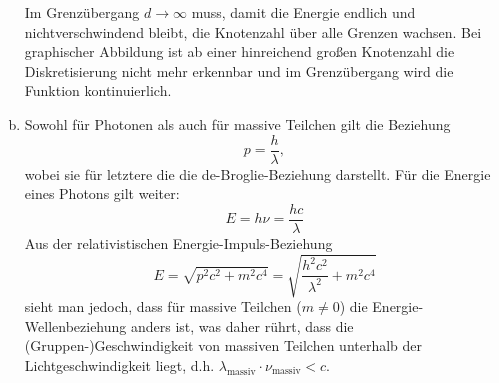 \begin{enumerate}[(a)]
Im Grenzübergang $d \to\infty$ muss, damit die Energie endlich und nichtverschwindend bleibt, die Knotenzahl über alle Grenzen wachsen. Bei graphischer Abbildung ist ab einer hinreichend großen Knotenzahl die Diskretisierung nicht mehr erkennbar und im Grenzübergang wird die Funktion kontinuierlich.

\item Sowohl für Photonen als auch für massive Teilchen gilt die Beziehung
\begin{equation}
p = \frac{h}{\lambda},
\end{equation}
wobei sie für letztere die die de-Broglie-Beziehung darstellt. Für die Energie eines Photons gilt weiter:
\begin{equation}
E = h\nu = \frac{hc}{\lambda}
\end{equation}
Aus der relativistischen Energie-Impuls-Beziehung
\begin{equation}
E = \sqrt{p^2c^2 + m^2 c^4} = \sqrt{\frac{h^2c^2}{\lambda^2} + m^2 c^4}
\end{equation}
sieht man jedoch, dass für massive Teilchen ($m\neq 0$) die Energie-Wellenbeziehung anders ist, was daher rührt, dass die (Gruppen-)Geschwindigkeit von massiven Teilchen unterhalb der Lichtgeschwindigkeit liegt, d.h. $\lambda_\text{massiv} \cdot \nu_\text{massiv} < c$.
\end{enumerate}